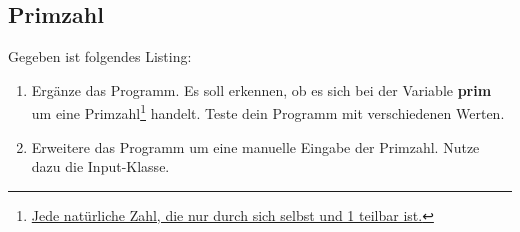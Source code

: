 \subsection{Primzahl }
Gegeben ist folgendes Listing:
\begin{enumerate}
	\item Ergänze das Programm. Es soll erkennen, ob es sich bei der Variable \textbf{prim} um eine Primzahl\footnote{\href{https://de.wikipedia.org/wiki/Primzahl}{Jede natürliche Zahl, die nur durch sich selbst und 1 teilbar ist.}} handelt. Teste dein Programm mit verschiedenen Werten.
	\item Erweitere das Programm um eine manuelle Eingabe der Primzahl. Nutze dazu die Input-Klasse.
\end{enumerate}
